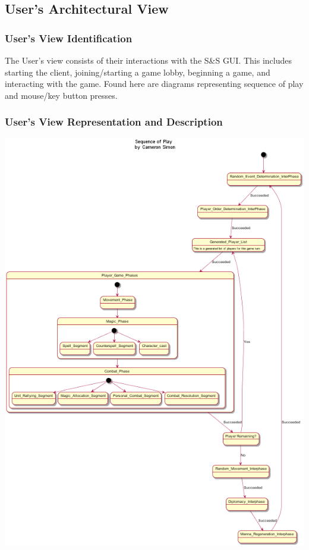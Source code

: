 \documentclass[12pt,a4paper,titlepage]{article}
\begin{document}
\subsection{User's Architectural View}
\subsubsection{User's View Identification}
The User's view consists of their interactions with the S\&S GUI. This includes starting the client, joining/starting a game lobby, beginning a game, and interacting with the game. Found here are diagrams representing sequence of play and mouse/key button presses.
\subsubsection{User's View Representation and Description}
\begin{center}
\includegraphics[width=\linewidth]{SequenceOfPlay.png}
\end{center}	
\end{document}
